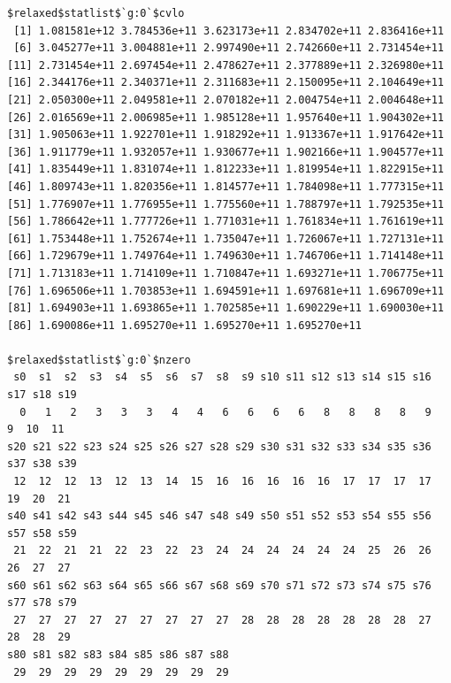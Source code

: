 \documentclass[
]{article}
\begin{document}
\begin{verbatim}
$relaxed$statlist$`g:0`$cvlo
 [1] 1.081581e+12 3.784536e+11 3.623173e+11 2.834702e+11 2.836416e+11
 [6] 3.045277e+11 3.004881e+11 2.997490e+11 2.742660e+11 2.731454e+11
[11] 2.731454e+11 2.697454e+11 2.478627e+11 2.377889e+11 2.326980e+11
[16] 2.344176e+11 2.340371e+11 2.311683e+11 2.150095e+11 2.104649e+11
[21] 2.050300e+11 2.049581e+11 2.070182e+11 2.004754e+11 2.004648e+11
[26] 2.016569e+11 2.006985e+11 1.985128e+11 1.957640e+11 1.904302e+11
[31] 1.905063e+11 1.922701e+11 1.918292e+11 1.913367e+11 1.917642e+11
[36] 1.911779e+11 1.932057e+11 1.930677e+11 1.902166e+11 1.904577e+11
[41] 1.835449e+11 1.831074e+11 1.812233e+11 1.819954e+11 1.822915e+11
[46] 1.809743e+11 1.820356e+11 1.814577e+11 1.784098e+11 1.777315e+11
[51] 1.776907e+11 1.776955e+11 1.775560e+11 1.788797e+11 1.792535e+11
[56] 1.786642e+11 1.777726e+11 1.771031e+11 1.761834e+11 1.761619e+11
[61] 1.753448e+11 1.752674e+11 1.735047e+11 1.726067e+11 1.727131e+11
[66] 1.729679e+11 1.749764e+11 1.749630e+11 1.746706e+11 1.714148e+11
[71] 1.713183e+11 1.714109e+11 1.710847e+11 1.693271e+11 1.706775e+11
[76] 1.696506e+11 1.703853e+11 1.694591e+11 1.697681e+11 1.696709e+11
[81] 1.694903e+11 1.693865e+11 1.702585e+11 1.690229e+11 1.690030e+11
[86] 1.690086e+11 1.695270e+11 1.695270e+11 1.695270e+11

$relaxed$statlist$`g:0`$nzero
 s0  s1  s2  s3  s4  s5  s6  s7  s8  s9 s10 s11 s12 s13 s14 s15 s16 s17 s18 s19 
  0   1   2   3   3   3   4   4   6   6   6   6   8   8   8   8   9   9  10  11 
s20 s21 s22 s23 s24 s25 s26 s27 s28 s29 s30 s31 s32 s33 s34 s35 s36 s37 s38 s39 
 12  12  12  13  12  13  14  15  16  16  16  16  16  17  17  17  17  19  20  21 
s40 s41 s42 s43 s44 s45 s46 s47 s48 s49 s50 s51 s52 s53 s54 s55 s56 s57 s58 s59 
 21  22  21  21  22  23  22  23  24  24  24  24  24  24  25  26  26  26  27  27 
s60 s61 s62 s63 s64 s65 s66 s67 s68 s69 s70 s71 s72 s73 s74 s75 s76 s77 s78 s79 
 27  27  27  27  27  27  27  27  27  28  28  28  28  28  28  28  27  28  28  29 
s80 s81 s82 s83 s84 s85 s86 s87 s88 
 29  29  29  29  29  29  29  29  29 



\end{verbatim}
\end{document}
